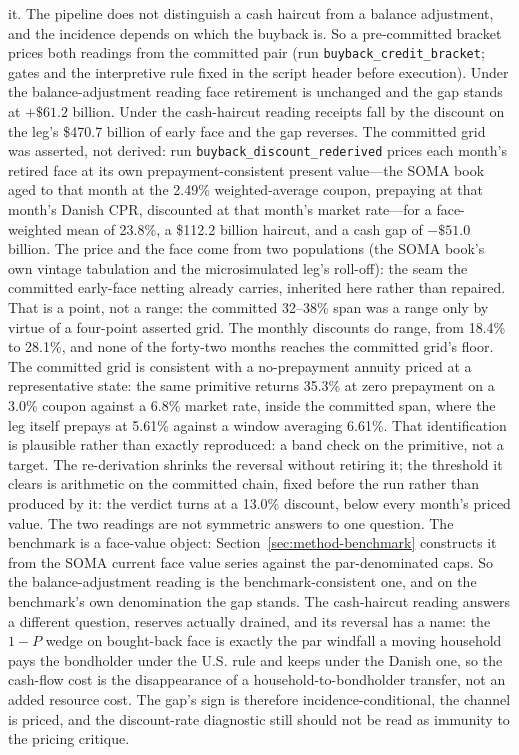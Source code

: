 \documentclass[12pt]{article}
\begin{document}
it. The pipeline does not distinguish a cash haircut from a balance adjustment, and the incidence depends on which the buyback is. So a pre-committed bracket prices both readings from the committed pair (run \texttt{buyback\_credit\_bracket}; gates and the interpretive rule fixed in the script header before execution). Under the balance-adjustment reading face retirement is unchanged and the gap stands at $+\$61.2$ billion. Under the cash-haircut reading receipts fall by the discount on the leg's \$470.7 billion of early face and the gap reverses. The committed grid was asserted, not derived: run \texttt{buyback\_discount\_rederived} prices each month's retired face at its own prepayment-consistent present value---the SOMA book aged to that month at the 2.49\% weighted-average coupon, prepaying at that month's Danish CPR, discounted at that month's market rate---for a face-weighted mean of 23.8\%, a \$112.2 billion haircut, and a cash gap of $-\$51.0$ billion. The price and the face come from two populations (the SOMA book's own vintage tabulation and the microsimulated leg's roll-off): the seam the committed early-face netting already carries, inherited here rather than repaired. That is a point, not a range: the committed 32--38\% span was a range only by virtue of a four-point asserted grid. The monthly discounts do range, from 18.4\% to 28.1\%, and none of the forty-two months reaches the committed grid's floor. The committed grid is consistent with a no-prepayment annuity priced at a representative state: the same primitive returns 35.3\% at zero prepayment on a 3.0\% coupon against a 6.8\% market rate, inside the committed span, where the leg itself prepays at 5.61\% against a window averaging 6.61\%. That identification is plausible rather than exactly reproduced: a band check on the primitive, not a target. The re-derivation shrinks the reversal without retiring it; the threshold it clears is arithmetic on the committed chain, fixed before the run rather than produced by it: the verdict turns at a 13.0\% discount, below every month's priced value. The two readings are not symmetric answers to one question. The benchmark is a face-value object: Section~\ref{sec:method-benchmark} constructs it from the SOMA current face value series against the par-denominated caps. So the balance-adjustment reading is the benchmark-consistent one, and on the benchmark's own denomination the gap stands. The cash-haircut reading answers a different question, reserves actually drained, and its reversal has a name: the $1-P$ wedge on bought-back face is exactly the par windfall a moving household pays the bondholder under the U.S. rule and keeps under the Danish one, so the cash-flow cost is the disappearance of a household-to-bondholder transfer, not an added resource cost. The gap's sign is therefore incidence-conditional, the channel is priced, and the discount-rate diagnostic still should not be read as immunity to the pricing critique.
\end{document}
